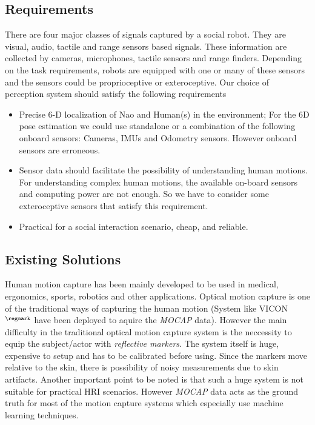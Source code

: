 \subsection{Requirements}
	There are four major classes of signals captured by a social robot. They are visual, audio, tactile and range sensors based signals. These information are collected by cameras, microphones, tactile sensors and range finders\cite{yan2014survey}. Depending on the task requirements, robots are equipped with one or many of these sensors and the sensors could be proprioceptive or exteroceptive. 
Our choice of perception system should satisfy the following requirements
\begin{itemize}
\item Precise 6-D localization of Nao and Human(s) in the environment; For the 6D pose estimation we could use standalone or a combination of the following onboard sensors: Cameras, IMUs and Odometry sensors. However onboard sensors are erroneous.
\item Sensor data should facilitate the possibility of understanding human motions. For understanding complex human motions, the available on-board sensors and computing power are not enough. So we have to consider some exteroceptive sensors that satisfy this requirement. 
\item Practical for a social interaction scenario, cheap, and reliable.
\end{itemize}
\subsection{Existing Solutions}
	Human motion capture has been mainly developed to be used in medical, ergonomics, sports, robotics and other applications. Optical motion capture is one of the traditional ways of capturing the human motion (System like VICON$^{\regmark}$ have been deployed to aquire the \emph{MOCAP} data). However the main difficulty in the traditional optical motion capture system is the neccessity to equip the subject/actor with \emph{reflective markers}. The system itself is huge, expensive to setup and has to be calibrated before using. Since the markers move relative to the skin, there is possibility of noisy measurements due to skin artifacts. Another important point to be noted is that such a huge system is not suitable for practical HRI scenarios. However \emph{MOCAP} data acts as the ground truth for most of the motion capture systems which especially use machine learning techniques.
	
